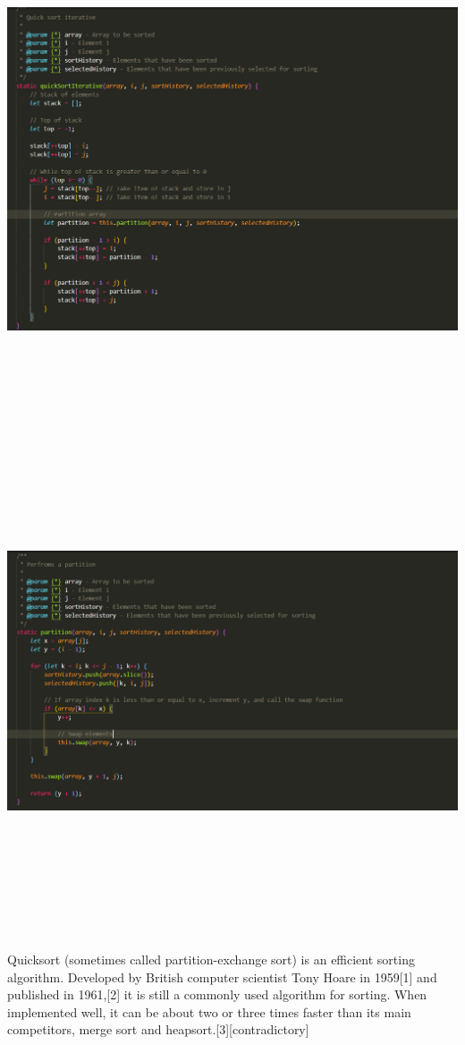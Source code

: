 \begin{center}
    \includegraphics[width=15cm,height=15cm,keepaspectratio]{images/quicksort3}
    \includegraphics[width=15cm,height=15cm,keepaspectratio]{images/quicksort2}
\end{center}
Quicksort (sometimes called partition-exchange sort) is an efficient sorting algorithm. Developed by British computer scientist Tony Hoare in 1959[1] and published in 1961,[2] it is still a commonly used algorithm for sorting. When implemented well, it can be about two or three times faster than its main competitors, merge sort and heapsort.[3][contradictory]

